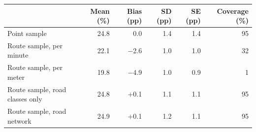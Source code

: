 \begin{tabular}{lrrrrr}
\toprule
 & Mean (\%) & Bias (pp) & SD (pp) & SE (pp) & Coverage (\%) \\
\midrule
Point sample & 24.8 & 0.0 & 1.4 & 1.4 & 95 \\
Route sample, per minute & 22.1 & $-$2.6 & 1.0 & 1.0 & 32 \\
Route sample, per meter & 19.8 & $-$4.9 & 1.0 & 0.9 & 1 \\
Route sample, road classes only & 24.8 & $+$0.1 & 1.1 & 1.1 & 95 \\
Route sample, road network & 24.9 & $+$0.1 & 1.2 & 1.1 & 95 \\
\bottomrule
\end{tabular}
